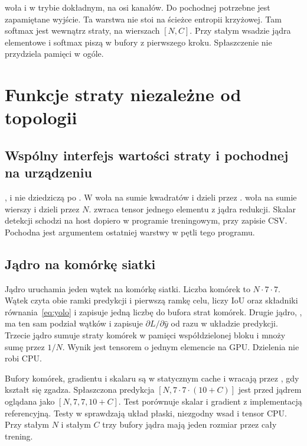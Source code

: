  woła  i  w trybie dokładnym, na osi kanałów. Do pochodnej potrzebne jest zapamiętane wyjście. Ta warstwa nie stoi na ścieżce entropii krzyżowej. Tam softmax jest wewnątrz straty, na wierszach \([N, C]\). Przy stałym wsadzie jądra elementowe i softmax piszą w bufory z pierwszego kroku. Spłaszczenie nie przydziela pamięci w ogóle.

\section{Funkcje straty niezależne od topologii}

\subsection{Wspólny interfejs wartości straty i pochodnej na urządzeniu}

,  i  nie dziedziczą po . W   woła  na sumie kwadratów i dzieli przez .  woła  na sumie wierszy i dzieli przez \(N\).  zwraca tensor jednego elementu z jądra redukcji. Skalar detekcji schodzi na host dopiero w programie treningowym, przy zapisie CSV. Pochodna jest argumentem  ostatniej warstwy w pętli tego programu.

\subsection{Jądro  na komórkę siatki}

Jądro  uruchamia jeden wątek na komórkę siatki. Liczba komórek to \(N \cdot 7 \cdot 7\). Wątek czyta obie ramki predykcji i pierwszą ramkę celu, liczy IoU oraz składniki równania~\eqref{eq:yolo} i zapisuje jedną liczbę do bufora strat komórek. Drugie jądro, , ma ten sam podział wątków i zapisuje \(\partial L / \partial \hat{y}\) od razu w układzie predykcji. Trzecie jądro sumuje straty komórek w pamięci współdzielonej bloku i mnoży sumę przez \(1/N\). Wynik jest tensorem o jednym elemencie na GPU. Dzielenia nie robi CPU.

Bufory komórek, gradientu i skalaru są w statycznym cache i wracają przez , gdy kształt się zgadza. Spłaszczona predykcja \([N, 7\cdot 7\cdot(10+C)]\) jest przed jądrem oglądana jako \([N, 7, 7, 10+C]\). Test  porównuje skalar i gradient z implementacją referencyjną. Testy w  sprawdzają układ płaski, niezgodny wsad i tensor CPU. Przy stałym \(N\) i stałym \(C\) trzy bufory jądra mają jeden rozmiar przez cały trening.

